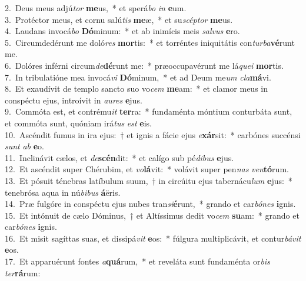 {2.~}Deus meus adjú\textit{tor} \textbf{me}us,~* et sperá\textit{bo} \textit{in} \textbf{e}um.\\
{3.~}Protéctor meus, et cornu salú\textit{tis} \textbf{me}æ,~* et su\textit{scép}\textit{tor} \textbf{me}us.\\
{4.~}Laudans invocá\textit{bo} \textbf{Dó}minum:~* et ab inimícis meis \textit{sal}\textit{vus} \textbf{e}ro.\\
{5.~}Circumdedérunt me doló\textit{res} \textbf{mor}tis:~* et torréntes iniquitátis con\textit{tur}\textit{ba}\textbf{vé}runt me.\\
{6.~}Dolóres inférni circum\textit{de}\textbf{dé}runt me:~* præoccupavérunt me lá\textit{que}\textit{i} \textbf{mor}tis.\\
{7.~}In tribulatióne mea invocá\textit{vi} \textbf{Dó}minum,~* et ad Deum me\textit{um} \textit{cla}\textbf{má}vi.\\
{8.~}Et exaudívit de templo sancto suo vo\textit{cem} \textbf{me}am:~* et clamor meus in conspéctu ejus, introívit in \textit{au}\textit{res} \textbf{e}jus.\\
{9.~}Commóta est, et contrému\textit{it} \textbf{ter}ra:~* fundaménta móntium conturbáta sunt, et commóta sunt, quóniam irá\textit{tus} \textit{est} \textbf{e}is.\\
{10.~}Ascéndit fumus in ira ejus:~† et ignis a fácie ejus \textit{e}\textbf{xár}sit:~* carbónes succénsi \textit{sunt} \textit{ab} \textbf{e}o.\\
{11.~}Inclinávit cælos, et \textit{de}\textbf{scén}dit:~* et calígo sub pé\textit{di}\textit{bus} \textbf{e}jus.\\
{12.~}Et ascéndit super Chérubim, et \textit{vo}\textbf{lá}vit:~* volávit super pen\textit{nas} \textit{ven}\textbf{tó}rum.\\
{13.~}Et pósuit ténebras latíbulum suum,~† in circúitu ejus tabernácu\textit{lum} \textbf{e}jus:~* tenebrósa aqua in nú\textit{bi}\textit{bus} \textbf{á}ëris.\\
{14.~}Præ fulgóre in conspéctu ejus nubes tran\textit{si}\textbf{é}runt,~* grando et car\textit{bó}\textit{nes} \textbf{i}gnis.\\
{15.~}Et intónuit de cælo Dóminus,~† et Altíssimus dedit vo\textit{cem} \textbf{su}am:~* grando et car\textit{bó}\textit{nes} \textbf{i}gnis.\\
{16.~}Et misit sagíttas suas, et dissipá\textit{vit} \textbf{e}os:~* fúlgura multiplicávit, et contur\textit{bá}\textit{vit} \textbf{e}os.\\
{17.~}Et apparuérunt fontes \textit{a}\textbf{quá}rum,~* et reveláta sunt fundaménta or\textit{bis} \textit{ter}\textbf{rá}rum:\\
